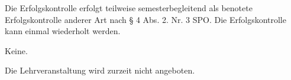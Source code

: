 \begin{course}

\setdoclanguagegerman
{}



\coursehead


\label{cour_8809.dp_997}


\begin{styleenv}
\begin{assessment}
Die Erfolgskontrolle erfolgt teilweise semesterbegleitend als benotete Erfolgskontrolle anderer Art nach § 4 Abs. 2. Nr. 3 SPO. Die Erfolgskontrolle kann einmal wiederholt werden.


\end{assessment}

\begin{conditions}Keine.\end{conditions}


\end{styleenv}

\begin{learningoutcomes}

\end{learningoutcomes}

\begin{content}

\end{content}





\begin{remarks}Die Lehrveranstaltung wird zurzeit nicht angeboten.

\end{remarks}

\end{course}